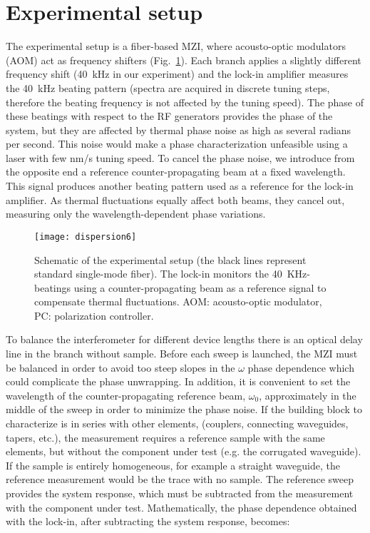 \section{Experimental setup}
The experimental setup is a fiber-based MZI, where acousto-optic modulators (AOM) act as frequency shifters (Fig.~\ref{fig:dispersionSetup}).
Each branch applies a slightly different frequency shift (40~kHz in our experiment) and the lock-in amplifier measures the 40~kHz beating pattern (spectra are acquired in discrete tuning steps, therefore the beating frequency is not affected by the tuning speed).
The phase of these beatings with respect to the RF generators provides the phase of the system, but they are affected by thermal phase noise as high as several radians per second. 
This noise would make a phase characterization unfeasible using a laser with few nm/s tuning speed.
To cancel the phase noise, we introduce from the opposite end a reference counter-propagating beam at a fixed wavelength.
This signal produces another beating pattern used as a reference for the lock-in amplifier.
As thermal fluctuations equally affect both beams, they cancel out, measuring only the wavelength-dependent phase variations.



\begin{figure}[htb]
	\centering
	\texttt{[image: dispersion6]}
	\caption{Schematic of the experimental setup (the black lines represent standard single-mode fiber).
	The lock-in monitors the 40~KHz-beatings using a counter-propagating beam as a reference signal to compensate thermal fluctuations.
	AOM: acousto-optic modulator, PC: polarization controller. }
	\label{fig:dispersionSetup}
\end{figure}
To balance the interferometer for different device lengths there is an optical delay line in the branch without sample.
Before each sweep is launched, the MZI must be balanced in order to avoid too steep slopes in the $\omega$ phase dependence which could complicate the phase unwrapping.
In addition, it is convenient to set the wavelength of the counter-propagating reference beam, $\omega_0$, approximately in the middle of the sweep in order to minimize the phase noise.
If the building block to characterize is in series with other elements, (couplers, connecting waveguides, tapers, etc.), the measurement requires a reference sample with the same elements, but without the component under test (e.g. the corrugated waveguide). If the sample is entirely homogeneous, for example a straight waveguide, the reference measurement would be the trace with no sample.
The reference sweep provides the system response, which must be subtracted from the measurement with the component under test. 
Mathematically, the phase dependence obtained with the lock-in, after subtracting the system response, becomes:


